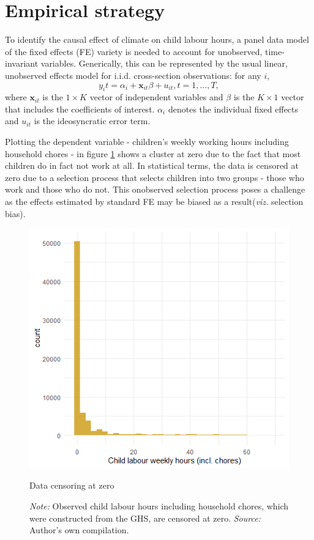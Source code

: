 \documentclass[a4paper,12pt]{article}
\theoremstyle{plain}
\theoremstyle{definition}
\theoremstyle{definition}
\theoremstyle{definition}
\theoremstyle{definition}
\begin{document}
\section{Empirical strategy}
\label{sec:empirical_strategy}

To identify the causal effect of climate on child labour hours, a panel data model of the fixed effects (FE) variety is needed to account for unobserved, time-invariant variables. Generically, this can be represented by the usual linear, unobserved effects model for i.i.d. cross-section observations: for any $i$,
\begin{equation}
\label{eq:linear_FE}
    y_it = \alpha_i + \mathbf{x}_{it} \beta + u_{it}, t=1,...,T,
\end{equation}
where $\mathbf{x}_{it}$ is the $1\times K$ vector of independent variables and $\beta$ is the $K\times 1$ vector that includes the coefficients of interest. $\alpha_i$ denotes the individual fixed effects and $u_{it}$ is the ideosyncratic error term.

Plotting the dependent variable - children's weekly working hours including household chores -  in figure \ref{fig:censored} shows a cluster at zero due to the fact that most children do in fact not work at all. In statistical terms, the data is censored at zero due to a selection process that selects children into two groups - those who work and those who do not. This onobserved selection process poses a challenge as the effects estimated by standard FE may be biased as a result(\textit{viz.} selection bias).

\begin{figure}[t!]
    \centering
    \includegraphics[scale=0.75]{../outputs/childworkchors.png}
    \caption{Data censoring at zero}
    \caption*{\footnotesize{\textit{Note:} Observed child labour hours including household chores, which were constructed from the GHS, are censored at zero. \textit{Source:} Author's own compilation.}}
    \label{fig:censored}
\end{figure}
\end{document}
